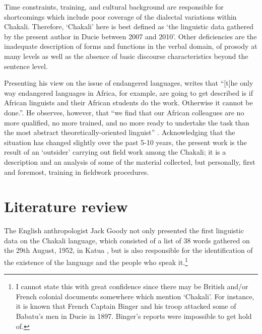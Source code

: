 Time constraints, training, and cultural background are responsible for
shortcomings which include   poor coverage of  the dialectal variations within
Chakali.  Therefore,   `Chakali'  here  is best defined as  `the linguistic
data
gathered by the present author in Ducie between 2007 and 2010'.  Other
deficiencies are the inadequate description of forms and functions in the verbal
domain,  of prosody at many levels as well as  the absence of basic discourse
characteristics beyond the sentence level.



Presenting his view on the issue of endangered languages,  \citet[9]{Newm03}
writes that ``[t]he only way endangered languages in Africa, for example, are
going to get described is if African linguists and their African students do the
work. Otherwise it cannot be done.''. He observes, however,   that ``we find
that our African colleagues are no more qualified, no more trained, and no more
ready to undertake the task than the most abstract theoretically-oriented
linguist''  \cite[9-19]{Newm03}. Acknowledging that the situation has changed 
slightly over the past 5-10 years, the present work is the result of an
`outsider'  carrying  out field work among the Chakali; it is a description and
an analysis of some of the material collected, but personally, first and
foremost, training in fieldwork procedures.















\section{Literature review}
\label{sec:INT-lit-rev}

The English anthropologist Jack Goody  not only  presented the first linguistic
data on the Chakali language, which consisted of a list of 38 words gathered  on
the 29th August, 1952,  in Katua \citep[33]{Good54}, but  is also responsible
for the
identification of the existence of the language and the people who speak
it.\footnote{I cannot state this with great  confidence since there may be
British and/or French colonial documents somewhere which mention `Chakali'. For
instance,  it is known that  French Captain  Binger and his
troop
attacked some of Babatu's men in  Ducie in 1897.  Binger's reports were
impossible to get hold of.}

